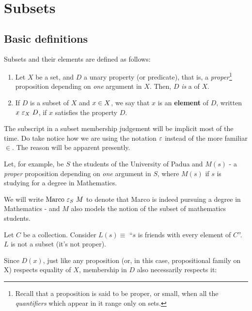 \section{Subsets}
\subsection{Basic definitions}

\begin{definition}[Subset]
  Subsets and their elements are defined as follows:
  \begin{enumerate}
  \item Let $X$ be a set, and $D$ a unary property (or predicate), that is, a
    \emph{proper}\footnote{Recall that a proposition is said to be proper, or
      small, when all the \emph{quantifiers} which appear in it range only on
      sets.} proposition depending on \emph{one} argument in \(X\).
    Then, \(D\) \emph{is} a  of \(X\).
  
  \item If \(D\) is a subset of \(X\) and \(x \in X\), we say that \(x\) is
    an \textbf{element} of \(D\), written \(x\ \varepsilon_{X}\ D\), if \(x\)
    satisfies the property \(D\).
  \end{enumerate}
\end{definition}

The subscript in a subset membership judgement will be implicit most of the
time. Do take notice how we are using the notation \(\varepsilon\) instead of the
more familiar \(\in\). The reason will be apparent presently.

\begin{example}
  Let, for example, be \(S\) the students of the University of Padua
  and \(M(s)\) - a \emph{proper} proposition depending on \emph{one}
  argument in \(S\), where \(M(s)\) if \(s\) is studying for a degree
  in Mathematics.
  
  We will write \(\text{Marco}\ \varepsilon_{S}\ M\) to denote that Marco is
  indeed pursuing a degree in Mathematics - and \(M\) also models the
  notion of the subset of mathematics students.
\end{example}

\begin{example}
  Let $C$ be a collection.
  Consider $L(s) \equiv$ ``$s$ is friends with every element of $C$''.
  $L$ is not a subset (it's not proper).
\end{example}

Since \(D(x)\), just like any proposition (or, in this case, propositional
family on X) respects equality of \(X\), membership in \(D\) also necessarily
respects it:

